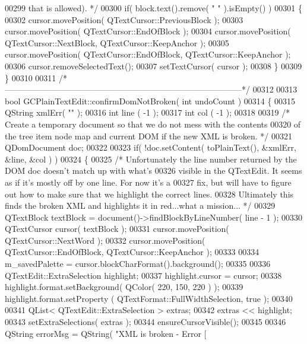 \begin{DoxyCode}
00299 \textcolor{comment}{    that is allowed). */}
00300   \textcolor{keywordflow}{if}( block.text().remove( \textcolor{stringliteral}{" "} ).isEmpty() )
00301   \{
00302     cursor.movePosition( QTextCursor::PreviousBlock );
00303     cursor.movePosition( QTextCursor::EndOfBlock );
00304     cursor.movePosition( QTextCursor::NextBlock, QTextCursor::KeepAnchor );
00305     cursor.movePosition( QTextCursor::EndOfBlock, QTextCursor::KeepAnchor );
00306     cursor.removeSelectedText();
00307     setTextCursor( cursor );
00308   \}
00309 \}
00310 
00311 \textcolor{comment}{/*
      --------------------------------------------------------------------------------------*/}
00312 
00313 \textcolor{keywordtype}{bool} GCPlainTextEdit::confirmDomNotBroken( \textcolor{keywordtype}{int} undoCount )
00314 \{
00315   QString xmlErr( \textcolor{stringliteral}{""} );
00316   \textcolor{keywordtype}{int}     line  ( -1 );
00317   \textcolor{keywordtype}{int}     col   ( -1 );
00318 
00319   \textcolor{comment}{/* Create a temporary document so that we do not mess with the contents}
00320 \textcolor{comment}{    of the tree item node map and current DOM if the new XML is broken. */}
00321   QDomDocument doc;
00322 
00323   \textcolor{keywordflow}{if}( !doc.setContent( toPlainText(), &xmlErr, &line, &col ) )
00324   \{
00325     \textcolor{comment}{/* Unfortunately the line number returned by the DOM doc doesn't match up
       with what's}
00326 \textcolor{comment}{      visible in the QTextEdit.  It seems as if it's mostly off by one line. 
       For now it's a}
00327 \textcolor{comment}{      fix, but will have to figure out how to make sure that we highlight the
       correct lines.}
00328 \textcolor{comment}{      Ultimately this finds the broken XML and highlights it in red...what a
       mission... */}
00329     QTextBlock textBlock = document()->findBlockByLineNumber( line - 1 );
00330     QTextCursor cursor( textBlock );
00331     cursor.movePosition( QTextCursor::NextWord );
00332     cursor.movePosition( QTextCursor::EndOfBlock, QTextCursor::KeepAnchor );
00333 
00334     m\_savedPalette = cursor.blockCharFormat().background();
00335 
00336     QTextEdit::ExtraSelection highlight;
00337     highlight.cursor = cursor;
00338     highlight.format.setBackground( QColor( 220, 150, 220 ) );
00339     highlight.format.setProperty  ( QTextFormat::FullWidthSelection, \textcolor{keyword}{true} );
00340 
00341     QList< QTextEdit::ExtraSelection > extras;
00342     extras << highlight;
00343     setExtraSelections( extras );
00344     ensureCursorVisible();
00345 
00346     QString errorMsg = QString( \textcolor{stringliteral}{"XML is broken - Error [%
}
\end{DoxyCode}
